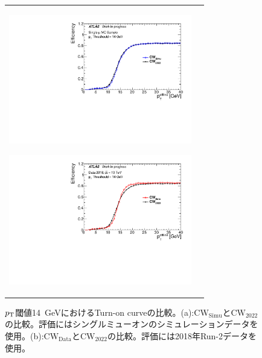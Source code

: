 \begin{figure}
    \begin{tabular}{cc}
    \centering
    \begin{minipage}[b]{0.45\hsize}%
        \centering
        \hspace*{-1.5cm}
        \includegraphics[clip, width=8cm]{fig/5/v05vsv07_MU14_re.pdf}
        \subcaption{}
        \label{fig:v05v07}
    \end{minipage}%
    \begin{minipage}[b]{0.7\hsize}%
        \centering
        \hspace*{-0.75cm}
        \includegraphics[clip, width=8cm]{fig/5/v05vsv06_MU14_re.pdf}
        \subcaption{}
        \label{fig:v05v06}
    \end{minipage}%
    \end{tabular}
    \caption{$p_{\rm{T}}$閾値14~GeVにおけるTurn-on curveの比較。(a):$\mathrm{CW_{Simu}}$と$\mathrm{CW_{2022}}$の比較。評価にはシングルミューオンのシミュレーションデータを使用。(b):$\mathrm{CW_{Data}}$と$\mathrm{CW_{2022}}$の比較。評価には2018年Run-2データを使用。}
    \label{fig:v05v07v06}
\end{figure}

